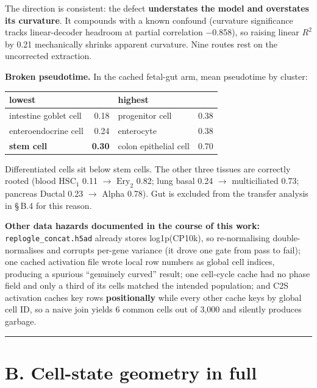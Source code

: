 The direction is consistent: the defect \textbf{understates the model and overstates its curvature}. It
compounds with a known confound (curvature significance tracks linear-decoder headroom at partial
correlation \(-\)0.858), so raising linear \(R^2\) by 0.21 mechanically shrinks apparent curvature. Nine routes
rest on the uncorrected extraction.

\textbf{Broken pseudotime.} In the cached fetal-gut arm, mean pseudotime by cluster:

\begin{longtable}[]{@{}lrlr@{}}
\toprule\noalign{}
lowest & & highest & \\
\midrule\noalign{}
\endhead
\bottomrule\noalign{}
\endlastfoot
intestine goblet cell & 0.18 & progenitor cell & 0.38 \\
enteroendocrine cell & 0.24 & enterocyte & 0.38 \\
\textbf{stem cell} & \textbf{0.30} & colon epithelial cell & 0.70 \\
\end{longtable}

Differentiated cells sit below stem cells. The other three tissues are correctly rooted (blood \(\mathrm{HSC}_1\)
0.11 \(\rightarrow\) \(\mathrm{Ery}_2\) 0.82; lung basal 0.24 \(\rightarrow\) multiciliated 0.73; pancreas Ductal 0.23 \(\rightarrow\) Alpha 0.78). Gut is
excluded from the transfer analysis in \S\,B.4 for this reason.

\textbf{Other data hazards documented in the course of this work:} \texttt{replogle\_concat.h5ad} already stores
log1p(CP10k), so re-normalising double-normalises and corrupts per-gene variance (it drove one gate
from pass to fail); one cached activation file wrote local row numbers as global cell indices,
producing a spurious ``genuinely curved'' result; one cell-cycle cache had no phase field and only a
third of its cells matched the intended population; and C2S activation caches key rows \textbf{positionally}
while every other cache keys by global cell ID, so a naive join yields 6 common cells out of 3,000 and
silently produces garbage.

\begin{center}\rule{0.5\linewidth}{0.5pt}\end{center}

\hypertarget{b.-cell-state-geometry-in-full}{%
\section{B. Cell-state geometry in full}\label{b.-cell-state-geometry-in-full}}


